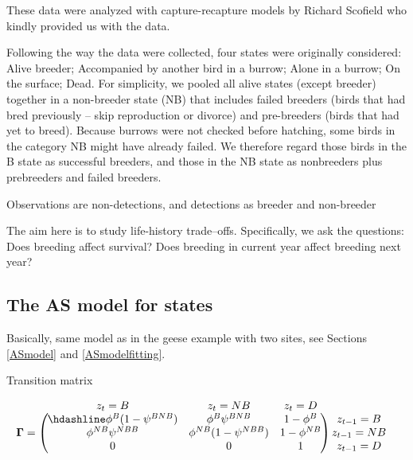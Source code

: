 \documentclass[
  12pt,
]{krantz}
\begin{document}
These data were analyzed with capture-recapture models by Richard Scofield who kindly provided us with the data.

Following the way the data were collected, four states were originally considered: Alive breeder; Accompanied by another bird in a burrow; Alone in a burrow; On the surface; Dead. For simplicity, we pooled all alive states (except breeder) together in a non-breeder state (NB) that includes failed breeders (birds that had bred previously -- skip reproduction or divorce) and pre-breeders (birds that had yet to breed). Because burrows were not checked before hatching, some birds in the category NB might have already failed. We therefore regard those birds in the B state as successful breeders, and those in the NB state as nonbreeders plus prebreeders and failed breeders.

Observations are non-detections, and detections as breeder and non-breeder

The aim here is to study life-history trade--offs. Specifically, we ask the questions: Does breeding affect survival? Does breeding in current year affect breeding next year?

\hypertarget{the-as-model-for-states}{%
\subsection{The AS model for states}\label{the-as-model-for-states}}

Basically, same model as in the geese example with two sites, see Sections \ref{ASmodel} and \ref{ASmodelfitting}.

Transition matrix

\[
\begin{matrix}
& \\
\mathbf{\Gamma} =
    \left ( \vphantom{ \begin{matrix} 12 \\ 12 \\ 12 \end{matrix} } \right .
\end{matrix}
\hspace{-1.2em}
\begin{matrix}
    z_t=B & z_t=NB & z_t=D \\ \hdashline
\phi^B (1-\psi^{BNB}) & \phi^B \psi^{BNB} & 1 - \phi^B\\
\phi^{NB} \psi^{NBB} & \phi^{NB} (1-\psi^{NBB}) & 1 - \phi^{NB}\\
0 & 0 & 1
\end{matrix}
\hspace{-0.2em}
\begin{matrix}
& \\
\left . \vphantom{ \begin{matrix} 12 \\ 12 \\ 12 \end{matrix} } \right )
    \begin{matrix}
    z_{t-1}=B \\ z_{t-1}=NB \\ z_{t-1}=D
    \end{matrix}
\end{matrix}
\]
\end{document}
